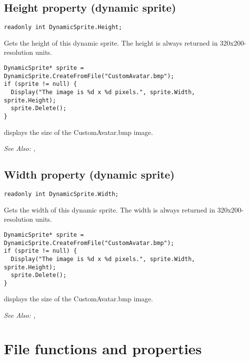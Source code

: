 \subsection{Height property (dynamic sprite)}\label{DynamicSprite.Height}%

\begin{verbatim}
readonly int DynamicSprite.Height;
\end{verbatim}
Gets the height of this dynamic sprite. The height is always returned in 320x200-resolution units.

\begin{verbatim}
DynamicSprite* sprite = DynamicSprite.CreateFromFile("CustomAvatar.bmp");
if (sprite != null) {
  Display("The image is %d x %d pixels.", sprite.Width, sprite.Height);
  sprite.Delete();
}
\end{verbatim}
displays the size of the CustomAvatar.bmp image.

\it{See Also:} ,


\subsection{Width property (dynamic sprite)}\label{DynamicSprite.Width}%

\begin{verbatim}
readonly int DynamicSprite.Width;
\end{verbatim}
Gets the width of this dynamic sprite. The width is always returned in 320x200-resolution units.

\begin{verbatim}
DynamicSprite* sprite = DynamicSprite.CreateFromFile("CustomAvatar.bmp");
if (sprite != null) {
  Display("The image is %d x %d pixels.", sprite.Width, sprite.Height);
  sprite.Delete();
}
\end{verbatim}
displays the size of the CustomAvatar.bmp image.

\it{See Also:} ,



\section{File functions and properties}%


